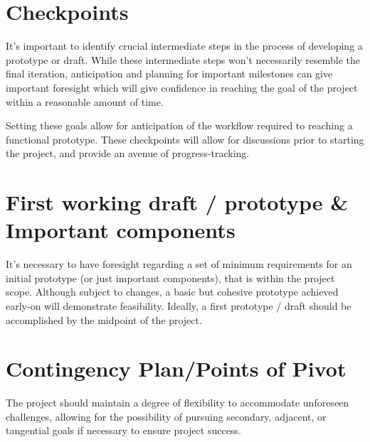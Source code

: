 \documentclass{report}
\begin{document}
	\section{Checkpoints}
        It's important to identify crucial intermediate steps in the process of developing a prototype or draft. While these intermediate steps won't necessarily resemble the final iteration, anticipation and planning for important milestones can give important foresight which will give confidence in reaching the goal of the project within a reasonable amount of time. 
        \newline
        
        \noindent
        Setting these goals allow for anticipation of the workflow required to reaching a functional prototype. These checkpoints will allow for discussions prior to starting the project, and provide an avenue of progress-tracking.


	\section{First working draft / prototype \& Important components }   
        It's necessary to have foresight regarding a set of minimum requirements for an initial prototype (or just important components), that is within the project scope. Although subject to changes, a basic but cohesive prototype achieved early-on will demonstrate feasibility. Ideally, a first prototype / draft should be accomplished by the midpoint of the project. 
 
	
	\section{Contingency Plan/Points of Pivot}

    The project should maintain a degree of flexibility to accommodate unforeseen challenges, allowing for the possibility of pursuing secondary, adjacent, or tangential goals if necessary to ensure project success.


\end{document}

